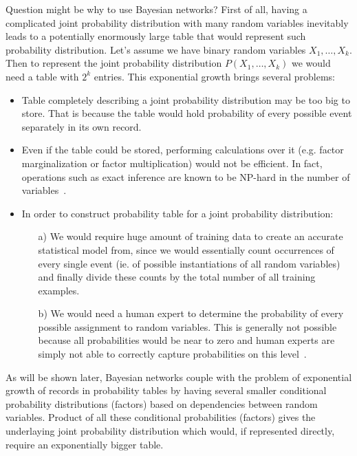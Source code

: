 \documentclass[english,cover]{fitthesis} %
\begin{document}
Question might be why to use Bayesian networks? First of all, having a complicated joint probability distribution with many random variables inevitably leads to a potentially enormously large table that would represent such probability distribution. Let's assume we have binary random variables $X_1, \dots, X_k$. Then to represent the joint probability distribution $P(X_1, \dots, X_k)$ we would need a table with $2^k$ entries. This exponential growth brings several problems:
\begin{itemize}
    \item Table completely describing a joint probability distribution may be too big to store. That is because the table would hold probability of every possible event separately in its own record.
    \item Even if the table could be stored, performing calculations over it (e.g. factor marginalization or factor multiplication) would not be efficient. In fact, operations such as exact inference are known to be NP-hard in the number of variables~\cite{pgm}.
    \item In order to construct probability table for a joint probability distribution:
    \begin{enumerate}
        \item[a)] We would require huge amount of training data to create an accurate statistical model from, since we would essentially count occurrences of every single event (ie. of possible instantiations of all random variables) and finally divide these counts by the total number of all training examples.
        \item[b)] We would need a human expert to determine the probability of every possible assignment to random variables. This is generally not possible because all probabilities would be near to zero and human experts are simply not able to correctly capture probabilities on this level~\cite{pgm}.
    \end{enumerate}
\end{itemize}

As will be shown later, Bayesian networks couple with the problem of exponential growth of records in probability tables by having several smaller conditional probability distributions (factors) based on dependencies between random variables. Product of all these conditional probabilities (factors) gives the underlaying joint probability distribution which would, if represented directly, require an exponentially bigger table.
\end{document}
